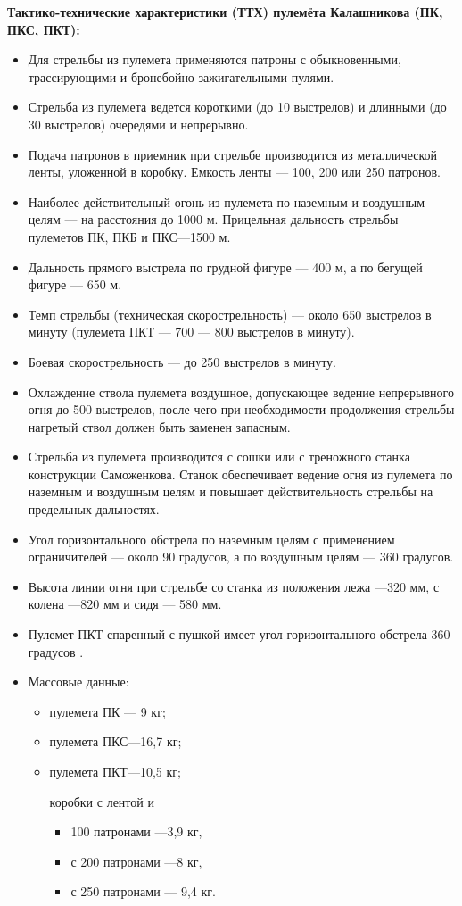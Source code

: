 \documentclass[12pt,a4paper]{report}
\begin{document}
\textbf{Тактико-технические характеристики (ТТХ) пулемёта Калашникова (ПК, ПКС, ПКТ):}
\begin{itemize}
\item Для стрельбы из пулемета применяются патроны с обыкновенными, трассирующими и бронебойно-зажигательными пулями.
\item Стрельба из пулемета ведется короткими (до 10 выстрелов) и длинными (до 30 выстрелов) очередями и непрерывно.
\item Подача патронов в приемник при стрельбе производится из металлической ленты, уложенной в коробку. Емкость ленты — 100, 200 или 250 патронов.
\item Наиболее действительный огонь из пулемета по наземным и воздушным целям — на расстояния до 1000 м. Прицельная дальность стрельбы пулеметов ПК, ПКБ и ПКС—1500 м.
\item Дальность прямого выстрела по грудной фигуре — 400 м, а по бегущей фигуре — 650 м.
\item Темп стрельбы (техническая скорострельность) — около 650 выстрелов в минуту (пулемета ПКТ — 700 — 800 выстрелов в минуту).
\item Боевая скорострельность — до 250 выстрелов в минуту.
\item Охлаждение ствола пулемета воздушное, допускающее ведение непрерывного огня до 500 выстрелов, после чего при необходимости продолжения стрельбы нагретый ствол должен быть заменен запасным.
\item Стрельба из пулемета производится с сошки или с треножного станка конструкции Саможенкова. Станок обеспечивает ведение огня из пулемета по наземным и воздушным целям и повышает действительность стрельбы на предельных дальностях.
\item Угол горизонтального обстрела по наземным целям с применением ограничителей — около 90 градусов, а по воздушным целям — 360 градусов.
\item Высота линии огня при стрельбе со станка из положения лежа —320 мм, с колена —820 мм и сидя — 580 мм.
\item Пулемет ПКТ спаренный с пушкой имеет угол горизонтального обстрела 360 градусов .
\item Массовые данные:
\begin{itemize}
 \item пулемета ПК — 9 кг; 
 \item пулемета ПКС—16,7 кг; 
 \item пулемета ПКТ—10,5 кг;
 
 коробки с лентой и
 \begin{itemize}
  \item 100 патронами —3,9 кг,   
  \item с 200 патронами —8 кг, 
  \item с 250 патронами — 9,4 кг.
   \end{itemize}
\end{itemize}
\end{itemize}
\end{document}
